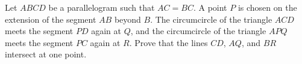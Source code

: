 Let $ABCD$ be a parallelogram such that $AC=BC$.
A point $P$ is chosen on the extension of the segment $AB$ beyond $B$.
The circumcircle of the triangle $ACD$ meets the segment $PD$ again at $Q$,
and the circumcircle of the triangle $APQ$ meets the segment $PC$ again at $R$.
Prove that the lines $CD$, $AQ$, and $BR$ intersect at one point.
